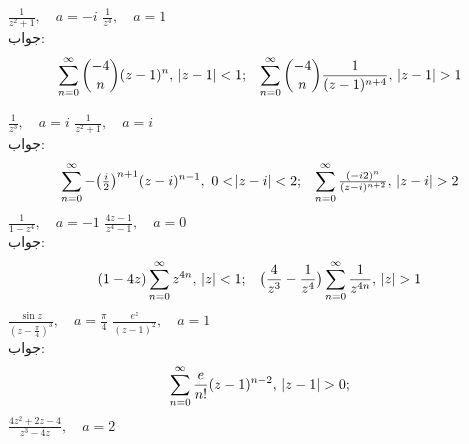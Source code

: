 \quad
$\tfrac{1}{z^2+1},\quad a=-i$
\quad
$\tfrac{1}{z^4},\quad a=1$\\
جواب:\quad
\begin{gather*}
\begin{aligned}
\sum\limits_{n=0}^{\infty}\binom{-4}{n} (z-1)^n,\,\,\abs{z-1}<1;
\end{aligned}\quad
\begin{aligned}
\sum\limits_{n=0}^{\infty} \binom{-4}{n} \frac{1}{(z-1)^{n+4}},\,\, \abs{z-1}>1
\end{aligned}
\end{gather*}

\quad
$\tfrac{1}{z^3},\quad a=i$
\quad
$\tfrac{1}{z^2+1},\quad a=i$\\
جواب:\quad
\begin{gather*}
\begin{aligned}
\sum\limits_{n=0}^{\infty}- \big(\tfrac{i}{2}\big)^{n+1} (z-i)^{n-1},\,\,0<\abs{z-i}<2;
\end{aligned}\quad
\begin{aligned}
\sum\limits_{n=0}^{\infty} \tfrac{(-i2)^n}{(z-i)^{n+2}},\,\, \abs{z-i}>2
\end{aligned}
\end{gather*}
\quad
$\tfrac{1}{1-z^4},\quad a=-1$
\quad
$\tfrac{4z-1}{z^4-1},\quad a=0$\\
جواب:\quad
\begin{gather*}
\begin{aligned}
(1-4z)\sum\limits_{n=0}^{\infty}z^{4n},\,\,\abs{z}<1;
\end{aligned}\quad
\begin{aligned}
\big(\frac{4}{z^3}-\frac{1}{z^4}\big)\sum\limits_{n=0}^{\infty} \frac{1}{z^{4n}},\,\, \abs{z}>1
\end{aligned}
\end{gather*}
\quad
$\tfrac{\sin z}{(z-\tfrac{\pi}{4})^3},\quad a=\tfrac{\pi}{4}$
\quad
$\tfrac{e^z}{(z-1)^2},\quad a=1$\\
جواب:
\begin{align*}
\sum\limits_{n=0}^{\infty}\frac{e}{n!}(z-1)^{n-2},\,\,\abs{z-1}>0;
\end{align*}
\quad
$\tfrac{4z^2+2z-4}{z^3-4z},\quad a=2$

